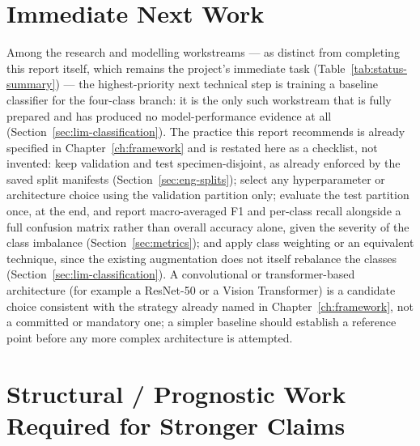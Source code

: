 \section{Immediate Next Work}
\label{sec:status-next}

Among the research and modelling workstreams — as distinct from completing
this report itself, which remains the project's immediate task
(Table~\ref{tab:status-summary}) — the highest-priority next technical
step is training a baseline classifier for the four-class branch: it is
the only such workstream that is fully prepared and has produced no
model-performance evidence at all
(Section~\ref{sec:lim-classification}). The practice this report
recommends is already specified in Chapter~\ref{ch:framework} and is
restated here as a checklist, not invented: keep validation and test
specimen-disjoint, as already enforced by the saved split manifests
(Section~\ref{sec:eng-splits}); select any hyperparameter or
architecture choice using the validation partition only; evaluate the
test partition once, at the end, and report macro-averaged F1 and
per-class recall alongside a full confusion matrix rather than overall
accuracy alone, given the severity of the class imbalance
(Section~\ref{sec:metrics}); and apply class weighting or an equivalent
technique, since the existing augmentation does not itself rebalance the
classes (Section~\ref{sec:lim-classification}). A convolutional or
transformer-based architecture (for example a ResNet-50 or a Vision
Transformer) is a candidate choice consistent with the strategy already
named in Chapter~\ref{ch:framework}, not a committed or mandatory one; a
simpler baseline should establish a reference point before any more
complex architecture is attempted.

\section{Structural / Prognostic Work Required for Stronger Claims}
\label{sec:status-structural-data}

